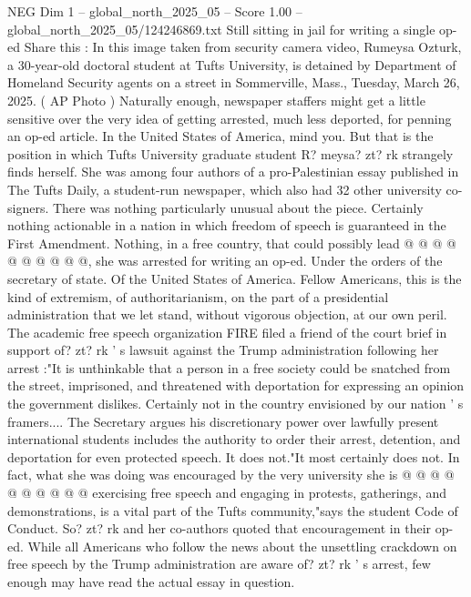 \begin{textsample}{NEG Dim 1 – global\_north\_2025\_05 – Score 1.00 – global\_north\_2025\_05/124246869.txt}  \label{ex:f1_neg_236}
Still sitting in jail for writing a single op-ed Share this : In this image taken from security camera video, Rumeysa Ozturk, a 30-year-old doctoral student at Tufts University, is detained by Department of Homeland Security agents on a street in Sommerville, Mass., Tuesday, March 26, 2025. ( AP Photo ) Naturally enough, newspaper staffers might get a little sensitive over the very idea of getting arrested, much less deported, for penning an op-ed article.
In the United States of America, mind you.
But that is the position in which Tufts University graduate student R? meysa? zt? rk strangely finds herself.
She was among four authors of a pro-Palestinian essay published in The Tufts Daily, a student-run newspaper, which also had 32 other university co-signers.
There was nothing particularly unusual about the piece.
Certainly nothing actionable in a nation in which freedom of speech is guaranteed in the First Amendment.
Nothing, in a free country, that could possibly lead @ @ @ @ @ @ @ @ @ @, she was arrested for writing an op-ed.
Under the orders of the secretary of state.
Of the United States of America.
Fellow Americans, this is the kind of extremism, of authoritarianism, on the part of a presidential administration that we let stand, without vigorous objection, at our own peril.
The academic free speech organization FIRE filed a friend of the court brief in support of? zt? rk ' s lawsuit against the Trump administration following her arrest :"It is unthinkable that a person in a free society could be snatched from the street, imprisoned, and threatened with deportation for expressing an opinion the government dislikes.
Certainly not in the country envisioned by our nation ' s framers....
The Secretary argues his discretionary power over lawfully present international students includes the authority to order their arrest, detention, and deportation for even protected speech.
It does not."It most certainly does not.
In fact, what she was doing was encouraged by the very university she is @ @ @ @ @ @ @ @ @ @ exercising free speech and engaging in protests, gatherings, and demonstrations, is a vital part of the Tufts community,"says the student Code of Conduct.
So? zt? rk and her co-authors quoted that encouragement in their op-ed.
While all Americans who follow the news about the unsettling crackdown on free speech by the Trump administration are aware of? zt? rk ' s arrest, few enough may have read the actual essay in question.

\end{textsample}
